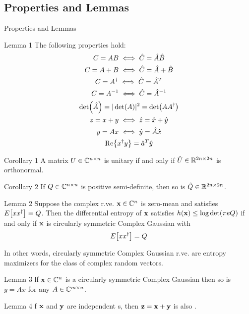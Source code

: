 \subsection{Properties and Lemmas}
\begin{frame}[allowframebreaks]{Properties and Lemmas}
\begin{block}{Lemma 1}
	The following properties hold:
	\begin{subequations}
	\begin{gather}
	C=AB \iff \hat{C} = \hat{A}\hat{B}\\
	C = A+B \iff \hat{C} = \hat{A} + \hat{B}\\
	C = A^\dagger \iff \hat{C}=\hat{A}^T\\
	C=A^{-1} \iff \hat{C} = \hat{A}^{-1}\\
	\det(\hat{A}) = |\det(A)|^2 = \det(A A^\dagger)\\
	z = x+y \iff \hat{z} = \hat{x}+\hat{y}\\
	y=Ax \iff \hat{y} = \hat{A}\hat{x}\\
	\Re{\ensuremath{x^\dagger}y} = \hat{a}^T\hat{y}
	\end{gather}
	\end{subequations}
\end{block}

\framebreak

\begin{block}{Corollary 1}
A matrix $U\in \mathbb{C}^{n\times n}$ is unitary if and only if $\hat{U}\in \mathbb{R}^{2n\times 2n}$ is orthonormal.
\end{block}
\begin{block}{Corollary 2}
If $Q\in \mathbb{C}^{n\times n}$ is positive semi-definite, then so is $\hat{Q}\in \mathbb{R}^{2n\times 2n}$.
\end{block}
\begin{alertblock}{Lemma 2}\justify
Suppose the complex r.ve. $\vb{x}\in \mathbb{C}^{n}$ is
zero-mean and satisfies $E\qty[xx^\dagger]=Q$. Then the differential entropy of $\vb{x}$ satisfies $h(\vb{x}) \leq \log\det(\pi e Q)$ if and only if $\vb{x}$ is circularly symmetric Complex Gaussian with
$$E\qty[xx^\dagger] = Q$$
\end{alertblock}
In other words, circularly symmetric Complex Gaussian r.ve. are entropy maximizers for the class of complex random vectors.

\framebreak

\begin{block}{Lemma 3}
lf $\vb{x}\in \mathbb{C}^{n}$ is a circularly symmetric Complex Gaussian then so is $y = Ax$ for any $A \in \mathbb{C}^{m\times n}$.
\end{block}
\begin{block}{Lemma 4}\label{lemma:4}
	f $\vb{x}$ and $\vb{y}$ are independent {\cscg s}, then $\vb{z}=\vb{x}+\vb{y}$ is also \cscg.
\end{block}

\end{frame}

